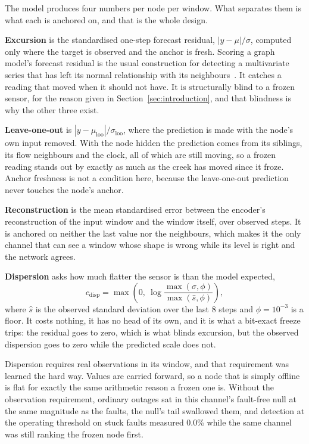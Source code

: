 \documentclass{article}
\begin{document}
The model produces four numbers per node per window. What separates them is
what each is anchored on, and that is the whole design.

\textbf{Excursion} is the standardised one-step forecast residual,
$|y - \mu| / \sigma$, computed only where the target is observed and the
anchor is fresh. Scoring a graph model's forecast residual is the usual
construction for detecting a multivariate series that has left its normal
relationship with its neighbours~\citep{deng2021gdn}. It catches a reading
that moved when it should not have. It is
structurally blind to a frozen sensor, for the reason given in
Section~\ref{sec:introduction}, and that blindness is why the other three
exist.

\textbf{Leave-one-out} is $|y - \mu_{\mathrm{loo}}| / \sigma_{\mathrm{loo}}$,
where the prediction is made with the node's own input removed. With the node
hidden the prediction comes from its siblings, its flow neighbours and the
clock, all of which are still moving, so a frozen reading stands out by exactly
as much as the creek has moved since it froze. Anchor freshness is not a
condition here, because the leave-one-out prediction never touches the node's
anchor.

\textbf{Reconstruction} is the mean standardised error between the encoder's
reconstruction of the input window and the window itself, over observed steps.
It is anchored on neither the last value nor the neighbours, which makes it the
only channel that can see a window whose shape is wrong while its level is
right and the network agrees.

\textbf{Dispersion} asks how much flatter the sensor is than the model expected,
\begin{equation}
  c_{\mathrm{disp}} = \max\!\left(0,\ \log \frac{\max(\sigma, \phi)}{\max(\hat{s}, \phi)}\right),
\end{equation}
where $\hat{s}$ is the observed standard deviation over the last 8 steps and
$\phi = 10^{-3}$ is a floor. It costs nothing, it has no head of its own, and it
is what a bit-exact freeze trips: the residual goes to zero, which is what
blinds excursion, but the observed dispersion goes to zero while the predicted
scale does not.

Dispersion requires real observations in its window, and that requirement was
learned the hard way. Values are carried forward, so a node that is simply
offline is flat for exactly the same arithmetic reason a frozen one is. Without
the observation requirement, ordinary outages sat in this channel's fault-free
null at the same magnitude as the faults, the null's tail swallowed them, and
detection at the operating threshold on stuck faults measured 0.0\% while the
same channel was still ranking the frozen node first.
\end{document}
